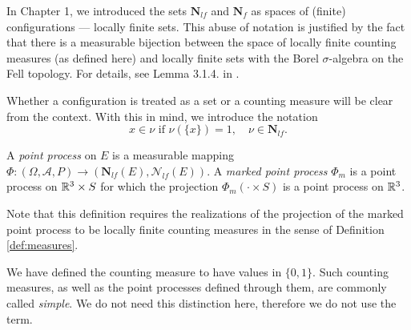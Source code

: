 

\begin{remark}
	In Chapter 1, we introduced the sets $\mathbf N_{lf}$ and $\mathbf N_f$ as spaces of (finite) configurations --- locally finite sets. This abuse of notation is justified by the fact that there is a measurable bijection between the space of locally finite counting measures (as defined here) and locally finite sets with the Borel $\sigma$-algebra on the Fell topology. For details, see Lemma 3.1.4. in \cite{SchneiderWeil2008}.   

	Whether a configuration is treated as a set or a counting measure will be clear from the context. With this in mind, we introduce the notation 
	$$x\in \nu \text{ if } \nu(\{x\})=1, \quad \nu \in \mathbf N_{lf}.$$
\end{remark}

\begin{definition}
A \textit{point process} on $E$ is a measurable mapping $\Phi:(\Omega,\mathcal A, P) \to (\mathbf N_{lf}(E),\mathcal N_{lf}(E))$. \newline
A \textit{marked point process} $\Phi_m$ is a point process on ${\mathbb R^3}\times S$ for which the projection $\Phi_m(\cdot \times S)$ is a point process on ${\mathbb R^3}$.
\end{definition}
Note that this definition requires the realizations of the projection of the marked point process to be locally finite counting measures in the sense of Definition \ref{def:measures}.

\begin{remark}
	We have defined the counting measure to have values in $\{0,1\}$. Such counting measures, as well as the point processes defined through them, are commonly called \textit{simple}. We do not need this distinction here, therefore we do not use the term.
\end{remark}


